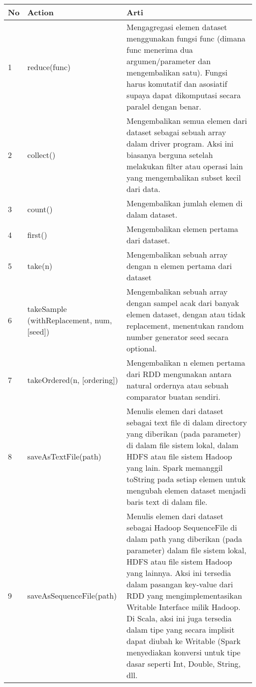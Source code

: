 \begin{tabular}{|p{}|p{}|p{}|}
\hline 
No & Action & Arti \\ 
\hline 
1 & reduce(func) & Mengagregasi elemen dataset menggunakan fungsi func (dimana func menerima dua argumen/parameter dan mengembalikan satu). Fungsi harus komutatif dan asosiatif supaya dapat dikomputasi secara paralel dengan benar. \\ 
\hline 
2 & collect() & Mengembalikan semua elemen dari dataset sebagai sebuah array dalam driver program. Aksi ini biasanya berguna setelah melakukan filter atau operasi lain yang mengembalikan subset kecil dari data. \\ 
\hline 
3 & count() & Mengembalikan jumlah elemen di dalam dataset. \\ 
\hline 
4 & first() & Mengembalikan elemen pertama dari dataset. \\ 
\hline 
5 & take(n) & Mengembalikan sebuah array dengan n elemen pertama dari dataset \\ 
\hline 
6 & takeSample (withReplacement, num, [seed]) & Mengembalikan sebuah array dengan sampel acak dari banyak elemen dataset, dengan atau tidak replacement, menentukan random number generator seed secara optional. \\ 
\hline 
7 & takeOrdered(n, [ordering]) & Mengembalikan n elemen pertama dari RDD mengunakan antara natural ordernya atau sebuah comparator buatan sendiri. \\ 
\hline 
8 & saveAsTextFile(path) & Menulis elemen dari dataset sebagai text file di dalam directory yang diberikan (pada parameter) di dalam file sistem lokal, dalam HDFS atau file sistem Hadoop yang lain. Spark memanggil toString pada setiap elemen untuk mengubah elemen dataset menjadi baris text di dalam file. \\ 
\hline 
9 & saveAsSequenceFile(path) & Menulis elemen dari dataset sebagai Hadoop SequenceFile di dalam path yang diberikan (pada parameter) dalam file sistem lokal, HDFS atau file sistem Hadoop yang lainnya. Aksi ini tersedia dalam pasangan key-value dari RDD yang mengimplementasikan Writable Interface milik Hadoop. Di Scala, aksi ini juga tersedia dalam tipe yang secara implisit dapat diubah ke Writable (Spark menyediakan konversi untuk tipe dasar seperti Int, Double, String, dll. \\ 
\hline 
\end{tabular}


